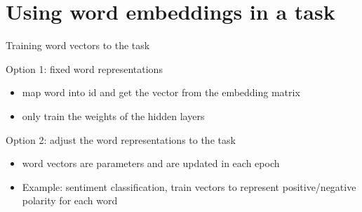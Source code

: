 \documentclass[12pt]{beamer}
\begin{document}
\section{Using word embeddings in a task}


\begin{frame}{Training word vectors to the task}


Option 1: fixed word representations

\begin{itemize}
	\item map word into id and get the vector from the embedding matrix
	\item only train the weights of the hidden layers
\end{itemize}


Option 2:  adjust the word representations to the task

\begin{itemize}
	\item word vectors are parameters and are updated in each epoch
	\item Example: sentiment classification, train vectors to represent positive/negative polarity for each word 
\end{itemize}

\end{frame}
\end{document}
